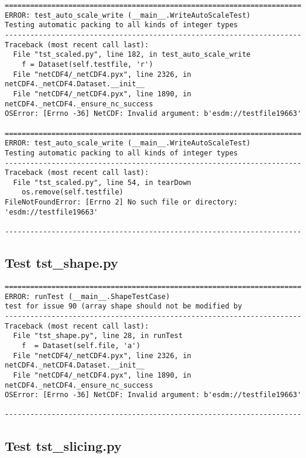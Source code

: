 \begin{verbatim}
======================================================================
ERROR: test_auto_scale_write (__main__.WriteAutoScaleTest)
Testing automatic packing to all kinds of integer types
----------------------------------------------------------------------
Traceback (most recent call last):
  File "tst_scaled.py", line 182, in test_auto_scale_write
    f = Dataset(self.testfile, 'r')
  File "netCDF4/_netCDF4.pyx", line 2326, in netCDF4._netCDF4.Dataset.__init__
  File "netCDF4/_netCDF4.pyx", line 1890, in netCDF4._netCDF4._ensure_nc_success
OSError: [Errno -36] NetCDF: Invalid argument: b'esdm://testfile19663'

======================================================================
ERROR: test_auto_scale_write (__main__.WriteAutoScaleTest)
Testing automatic packing to all kinds of integer types
----------------------------------------------------------------------
Traceback (most recent call last):
  File "tst_scaled.py", line 54, in tearDown
    os.remove(self.testfile)
FileNotFoundError: [Errno 2] No such file or directory: 'esdm://testfile19663'

----------------------------------------------------------------------
\end{verbatim}

\subsection{Test tst\_shape.py}

\begin{verbatim}
======================================================================
ERROR: runTest (__main__.ShapeTestCase)
test for issue 90 (array shape should not be modified by
----------------------------------------------------------------------
Traceback (most recent call last):
  File "tst_shape.py", line 28, in runTest
    f  = Dataset(self.file, 'a')
  File "netCDF4/_netCDF4.pyx", line 2326, in netCDF4._netCDF4.Dataset.__init__
  File "netCDF4/_netCDF4.pyx", line 1890, in netCDF4._netCDF4._ensure_nc_success
OSError: [Errno -36] NetCDF: Invalid argument: b'esdm://testfile19663'

----------------------------------------------------------------------
\end{verbatim}

\subsection{Test tst\_slicing.py}

